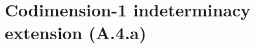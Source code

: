 
\chapter{Codimension-1 indeterminacy extension (A.4.a)}
\label{chap:Albanese_CodimOneExtension}

%
%

